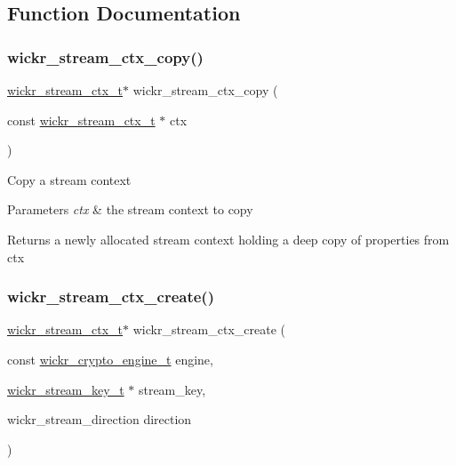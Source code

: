 \subsection{Function Documentation}
\mbox{\label{group__wickr__stream_ga707b685e35eb437c33f5ec32c6760005}} 
\subsubsection{\texorpdfstring{wickr\+\_\+stream\+\_\+ctx\+\_\+copy()}{wickr\_stream\_ctx\_copy()}}
{\footnotesize\ttfamily \hyperlink{structwickr__stream__ctx}{wickr\+\_\+stream\+\_\+ctx\+\_\+t}$\ast$ wickr\+\_\+stream\+\_\+ctx\+\_\+copy (\begin{DoxyParamCaption}\item[{const \hyperlink{structwickr__stream__ctx}{wickr\+\_\+stream\+\_\+ctx\+\_\+t} $\ast$}]{ctx }\end{DoxyParamCaption})}

Copy a stream context


\begin{DoxyParams}{Parameters}
{\em ctx} & the stream context to copy \\
\hline
\end{DoxyParams}
\begin{DoxyReturn}{Returns}
a newly allocated stream context holding a deep copy of properties from \textquotesingle{}ctx\textquotesingle{} 
\end{DoxyReturn}
\mbox{\label{group__wickr__stream_ga0b5c513a3e0958dc7fd4f8455206e32e}} 
\subsubsection{\texorpdfstring{wickr\+\_\+stream\+\_\+ctx\+\_\+create()}{wickr\_stream\_ctx\_create()}}
{\footnotesize\ttfamily \hyperlink{structwickr__stream__ctx}{wickr\+\_\+stream\+\_\+ctx\+\_\+t}$\ast$ wickr\+\_\+stream\+\_\+ctx\+\_\+create (\begin{DoxyParamCaption}\item[{const \hyperlink{structwickr__crypto__engine}{wickr\+\_\+crypto\+\_\+engine\+\_\+t}}]{engine,  }\item[{\hyperlink{structwickr__stream__key}{wickr\+\_\+stream\+\_\+key\+\_\+t} $\ast$}]{stream\+\_\+key,  }\item[{wickr\+\_\+stream\+\_\+direction}]{direction }\end{DoxyParamCaption})}

